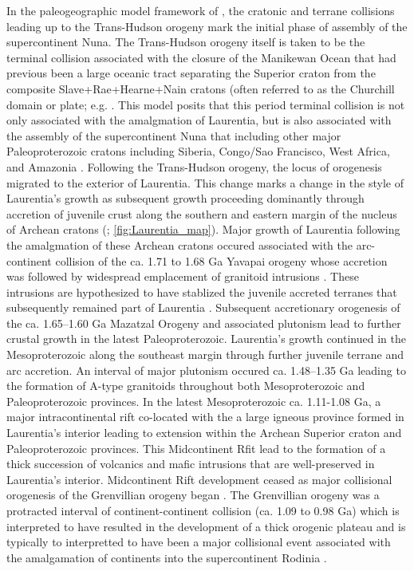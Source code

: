 \documentclass[11pt,letterpaper]{article}
\begin{document}
In the paleogeographic model framework of \cite{Pehrsson2015a}, the cratonic and terrane collisions leading up to the Trans-Hudson orogeny mark the initial phase of assembly of the supercontinent Nuna. The Trans-Hudson orogeny itself is taken to be the terminal collision associated with the closure of the Manikewan Ocean that had previous been a large oceanic tract separating the Superior craton from the composite Slave+Rae+Hearne+Nain cratons (often referred to as the Churchill domain or plate; e.g. \citealp{Skipton2016a, Weller2017a}. This model posits that this period terminal collision is not only associated with the amalgmation of Laurentia, but is also associated with the assembly of the supercontinent Nuna that including other major Paleoproterozoic cratons including Siberia, Congo/Sao Francisco, West Africa, and Amazonia \citep{Pehrsson2015a}. Following the Trans-Hudson orogeny, the locus of orogenesis migrated to the exterior of Laurentia. This change marks a change in the style of Laurentia's growth as subsequent growth proceeding dominantly through accretion of juvenile crust along the southern and eastern margin of the nucleus of Archean cratons (\citealp{Whitmeyer2007a}; \ref{fig:Laurentia_map}). Major growth of Laurentia following the amalgmation of these Archean cratons occured associated with the arc-continent collision of the ca. 1.71 to 1.68 Ga Yavapai orogeny whose accretion was followed by widespread emplacement of granitoid intrusions \citep{Whitmeyer2007a}. These intrusions are hypothesized to have stablized the juvenile accreted terranes that subsequently remained part of Laurentia \citep{Whitmeyer2007a}. Subsequent accretionary orogenesis of the ca. 1.65–1.60 Ga Mazatzal Orogeny and associated plutonism lead to further crustal growth in the latest Paleoproterozoic. Laurentia's growth continued in the Mesoproterozoic along the southeast margin through further juvenile terrane and arc accretion. An interval of major plutonism occured ca. 1.48–1.35 Ga leading to the formation of A-type granitoids throughout both Mesoproterozoic and Paleoproterozoic provinces. In the latest Mesoproterozoic ca. 1.11-1.08 Ga, a major intracontinental rift co-located with the a large igneous province formed in Laurentia's interior leading to extension within the Archean Superior craton and Paleoproterozoic provinces. This Midcontinent Rfit lead to the formation of a thick succession of volcanics and mafic intrusions that are well-preserved in Laurentia's interior.  Midcontinent Rift development ceased as major collisional orogenesis of the Grenvillian orogeny began \citep{Swanson-Hysell2019a}. The Grenvillian orogeny was a protracted interval of continent-continent collision (ca. 1.09 to 0.98 Ga) which is interpreted to have resulted in the development of a thick orogenic plateau \citep{Rivers2008a} and is typically to interpretted to have been a major collisional event associated with the amalgamation of continents into the supercontinent Rodinia \citep{Hoffman1991a}.
\end{document}
